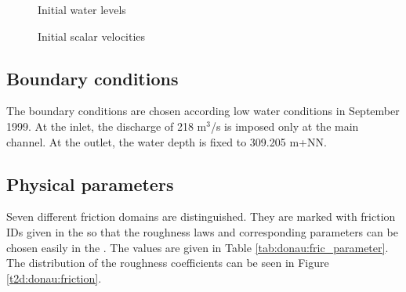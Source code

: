 \begin{figure} [h!]
\centering
{}
\caption{Initial water levels}
\label{t2d:donau:free_surface0}
\end{figure}

\begin{figure} [h!]
\centering
{}
\caption{Initial scalar velocities}
\label{t2d:donau:ini_flow}
\end{figure}

\subsection{Boundary conditions}
The boundary conditions are chosen according low water conditions in September 1999.
At the inlet, the discharge of 218 m$^3$/s is imposed only at the main channel.
At the outlet, the water depth is fixed to 309.205 m+NN.



\subsection{Physical parameters}
Seven different friction domains are distinguished.
They are marked with friction IDs given in the  so that the
roughness laws and corresponding parameters can be chosen easily in the
.
The values are given in Table \ref{tab:donau:fric_parameter}.
The distribution of the roughness coefficients can be seen in Figure
\ref{t2d:donau:friction}.

\begin{table}[H]
\caption{Friction law and parameter for the different friction domains.}
\label{tab:donau:fric_parameter}
\end{table}

